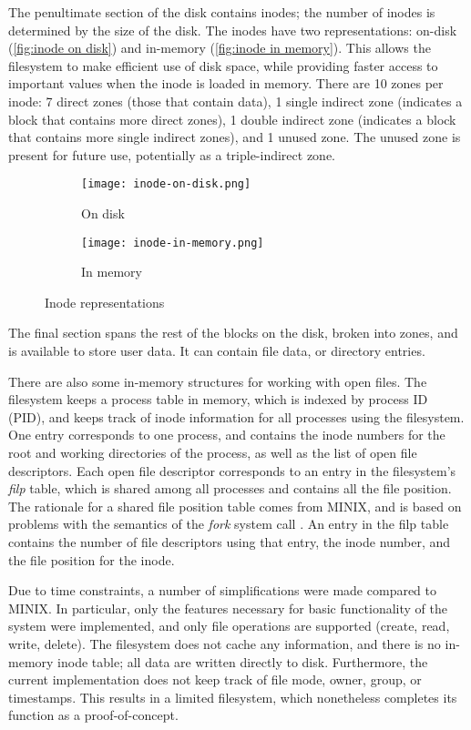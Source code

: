 The penultimate section of the disk contains inodes; the number of inodes is determined by the size of the disk.
The inodes have two representations: on-disk (\autoref{fig:inode on disk}) and in-memory (\autoref{fig:inode in memory}).
This allows the filesystem to make efficient use of disk space, while providing faster access to important values when the inode is loaded in memory.
There are 10 zones per inode: 7 direct zones (those that contain data), 1 single indirect zone (indicates a block that contains more direct zones), 1 double indirect zone (indicates a block that contains more single indirect zones), and 1 unused zone.
The unused zone is present for future use, potentially as a triple-indirect zone.

\begin{figure}[tb]
     \centering
     \begin{subfigure}[b]{0.45\textwidth}
         \centering
         \texttt{[image: inode-on-disk.png]}
         \caption{On disk}
         \label{fig:inode on disk}
     \end{subfigure}
     \begin{subfigure}[b]{0.45\textwidth}
         \centering
         \texttt{[image: inode-in-memory.png]}
         \caption{In memory}
         \label{fig:inode in memory}
     \end{subfigure}
     \caption{Inode representations}
     \label{fig:inode representations}
\end{figure}


The final section spans the rest of the blocks on the disk, broken into zones, and is available to store user data.
It can contain file data, or directory entries.

There are also some in-memory structures for working with open files.
The filesystem keeps a process table in memory, which is indexed by process ID (PID), and keeps track of inode information for all processes using the filesystem.
One entry corresponds to one process, and contains the inode numbers for the root and working directories of the process, as well as the list of open file descriptors.
Each open file descriptor corresponds to an entry in the filesystem's \textit{filp} table, which is shared among all processes and contains all the file position.
The rationale for a shared file position table comes from MINIX, and is based on problems with the semantics of the \textit{fork} system call \cite{tanenbaum1997}.
An entry in the filp table contains the number of file descriptors using that entry, the inode number, and the file position for the inode.

Due to time constraints, a number of simplifications were made compared to MINIX.
In particular, only the features necessary for basic functionality of the system were implemented, and only file operations are supported (create, read, write, delete).
The filesystem does not cache any information, and there is no in-memory inode table; all data are written directly to disk.
Furthermore, the current implementation does not keep track of file mode, owner, group, or timestamps.
This results in a limited filesystem, which nonetheless completes its function as a proof-of-concept.
